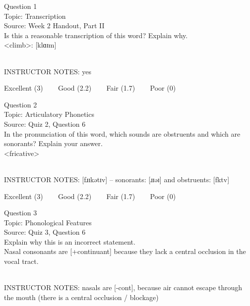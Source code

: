 \documentclass[12pt]{article}
\begin{document}
\begin{center}
\textbf{{\color{blue}{\HUGE START OF EXAM\\}}}

\textbf{{\color{blue}{\HUGE Student ID: 50775\\}}}

\textbf{{\color{blue}{\HUGE \\}}}

\end{center}
\newpage

{\large Question 1}\\

Topic: Transcription\\
Source: Week 2 Handout, Part II\\

Is this a reasonable transcription of this word? Explain why.\\

<climb>: {[klɑɪm]}


~\\
INSTRUCTOR NOTES: yes


\vfill
Excellent (3) ~~~ Good (2.2) ~~~ Fair (1.7) ~~~ Poor (0)
\newpage

{\large Question 2}\\

Topic: Articulatory Phonetics\\
Source: Quiz 2, Question 6\\

In the pronunciation of this word, which sounds are obstruents and which are sonorants? Explain your answer.\\

<fricative>


~\\
INSTRUCTOR NOTES: [fɹɪkətɪv] -- sonorants: [ɹɪəɪ] and obstruents: [fktv]


\vfill
Excellent (3) ~~~ Good (2.2) ~~~ Fair (1.7) ~~~ Poor (0)
\newpage

{\large Question 3}\\

Topic: Phonological Features\\
Source: Quiz 3, Question 6\\

Explain why this is an incorrect statement.\\

Nasal consonants are {[+continuant]} because they lack a central occlusion in the vocal tract.


~\\
INSTRUCTOR NOTES: nasals are [-cont], because air cannot escape through the mouth (there is a central occlusion / blockage)
\end{document}
